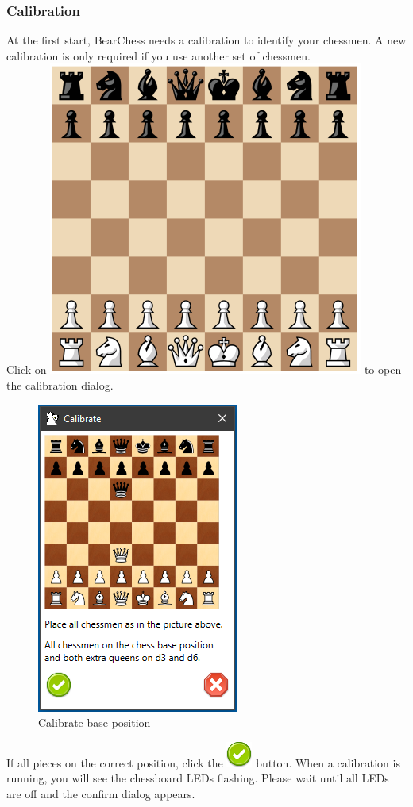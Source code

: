 \documentclass[11pt,a4paper]{article}
\begin{document}
\subsubsection{Calibration}
At the first start, BearChess needs a calibration to identify your chessmen. A new calibration is only required if you use another set of chessmen.\\
Click on \includegraphics[scale=0.08]{chessboard_base.png} to open the calibration dialog.
\begin{figure}[H]
	\centering
	\includegraphics[scale=1.0]{CalibrateBase.png}
	\caption{Calibrate base position }
	\label{fig:CalibrateBase}
\end{figure}
If all pieces on the correct position, click the \includegraphics[scale=0.5]{accept_button.png} button. When a calibration is running, you will see the chessboard LEDs flashing. Please wait until all LEDs are off and the confirm dialog appears.
\end{document}
